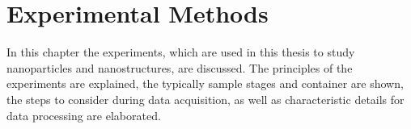 \documentclass[\main/dresen_thesis.tex]{subfiles}
\renewcommand{\thisPath}{\main/chapters/methods}
\begin{document}
  \chapter{Experimental Methods}\label{ch:methods}
    In this chapter the experiments, which are used in this thesis to study nanoparticles and nanostructures, are discussed.
    The principles of the experiments are explained, the typically sample stages and container are shown, the steps to consider during data acquisition, as well as characteristic details for data processing are elaborated.

    
      \FloatBarrier
    
      \FloatBarrier
    
      \FloatBarrier
    
      \FloatBarrier
    
      \FloatBarrier
    
      \FloatBarrier
    
      \FloatBarrier
    
      \FloatBarrier
    
      \FloatBarrier
\end{document}
